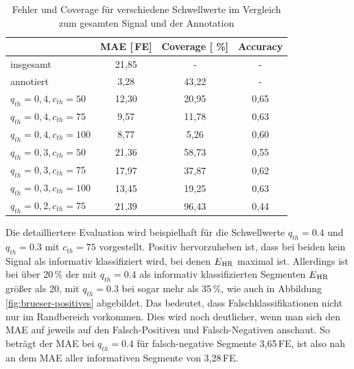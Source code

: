   \begin{table}[h] %
  
 	\centering
 	\begin{tabular}{l || c | c | c}
 									& \ac{MAE} [\,\si{FE}]	& Coverage [	\%]	& Accuracy\\ \hline
 		insgesamt 					& 21{,}85				& -				& - \\
 		annotiert					& 3{,}28					& 43{,}22		& - \\ \hline
 		$q_{th}=0{,}4, c_{th}=50$	& 12{,}30				& 20{,}95		& 0{,}65\\
 		$q_{th}=0{,}4, c_{th}=75$	& 9{,}57					& 11{,}78		& 0{,}63\\
 		$q_{th}=0{,}4, c_{th}=100$	& 8{,}77					& 5{,}26			& 0{,}60\\ \hline
 		$q_{th}=0{,}3, c_{th}=50$	& 21{,}36				& 58{,}73		& 0{,}55\\
 		$q_{th}=0{,}3, c_{th}=75$	& 17{,}97				& 37{,}87		& 0{,}62\\
 		$q_{th}=0{,}3, c_{th}=100$	& 13{,}45				& 19{,}25		& 0{,}63\\ \hline
 		$q_{th}=0{,}2, c_{th}=75$	& 21{,}39				& 96{,}43		& 0{,}44\\
 	\end{tabular}
 	\caption[Fehler und Coverage der Klassifikation nach der Ähnlichkeit der Intervallschätzer des CLIE-Algorithmus für verschiedene Schwellwerte im Vergleich zum gesamten Signal und der Annotation]{Fehler und Coverage für verschiedene Schwellwerte im Vergleich zum gesamten Signal und der Annotation}
 	\label{fig:brueser-sqi-MAE-Coverage}
 	\end{table}
 	
 Die detailliertere Evaluation wird beispielhaft für die Schwellwerte $q_{th} = 0.4$ und $q_{th} = 0.3$ mit $c_{th}=75$ vorgestellt. Positiv hervorzuheben ist, dass bei beiden kein Signal als informativ klassifiziert wird, bei denen $E\textsubscript{HR}$ maximal ist. Allerdings ist bei über 20\,\% der mit $q_{th} = 0.4$ als informativ klassifizierten Segmenten $E\textsubscript{HR}$ größer als 20, mit $q_{th} = 0.3$ bei sogar mehr als 35\,\%, wie auch in Abbildung \ref{fig:brueser-positives} abgebildet. Das bedeutet, dass Falschklassifikationen nicht nur im Randbereich vorkommen. Dies wird noch deutlicher, wenn man sich den \ac{MAE} auf jeweils auf den Falsch-Positiven und Falsch-Negativen anschaut. So beträgt der \ac{MAE} bei $q_{th} = 0.4$ für falsch-negative Segmente 3,65\,\si{FE}, ist also nah an dem \ac{MAE} aller informativen Segmente von 3,28\,\si{FE}.
 
